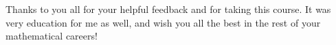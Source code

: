 \documentclass[11pt]{article}
\theoremstyle{plain}
\theoremstyle{definition}
\theoremstyle{remark}
\begin{document}
Thanks to you all for your helpful feedback and for taking this course. It was very education for me as well, and wish you all the best in the rest of your mathematical careers!



% 
% 

\end{document}
